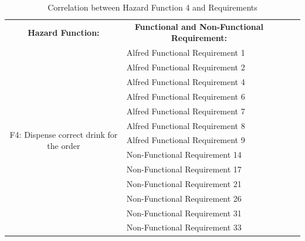 \documentclass [10pt]{article}
\begin{document}


\begin{table}
\centering
\begin{tabular}{|c|l|lll}
\cline{1-2}
\textbf{Hazard Function:} & \multicolumn{1}{c|}{\textbf{Functional and Non-Functional Requirement:}} &  &  &  \\ \cline{1-2}
\multirow{13}{*}{F4: Dispense correct drink for the order} 
				& Alfred Functional Requirement 1	&  &  &  \\ \cline{2-2}
                                  & Alfred Functional Requirement 2	&  &  &  \\ \cline{2-2}
                                  & Alfred Functional Requirement 4 	&  &  &  \\ \cline{2-2}
                                  & Alfred Functional Requirement 6	&  &  &  \\ \cline{2-2}
                                  & Alfred Functional Requirement 7	&  &  &  \\ \cline{2-2}
				& Alfred Functional Requirement 8	&  &  &  \\ \cline{2-2}
				& Alfred Functional Requirement 9	&  &  &  \\ \cline{2-2}
                                  & Non-Functional Requirement 14	&  &  &  \\ \cline{2-2}
                                  & Non-Functional Requirement 17	&  &  &  \\ \cline{2-2}
                                  & Non-Functional Requirement 21	&  &  &  \\ \cline{2-2}
                                  & Non-Functional Requirement 26	&  &  &  \\ \cline{2-2}
                                  & Non-Functional Requirement 31	&  &  &  \\ \cline{2-2}
                                  & Non-Functional Requirement 33	&  &  &  \\ \cline{1-2}
\end{tabular}
\caption{Correlation between Hazard Function 4 and Requirements}  
\end{table}


\end{document}
